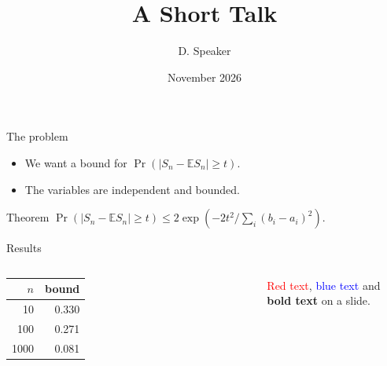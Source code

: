 \documentclass{beamer}
\title{A Short Talk}
\author{D. Speaker}
\date{November 2026}
\begin{document}
\frame{\titlepage}
\begin{frame}{The problem}
\begin{itemize}
\item We want a bound for $\Pr(|S_n - \mathbb{E} S_n| \ge t)$.
\item The variables are independent and bounded.
\end{itemize}
\begin{block}{Theorem}
$\Pr(|S_n - \mathbb{E} S_n| \ge t) \le 2\exp\left(-2t^2 / \sum_i (b_i - a_i)^2\right)$.
\end{block}
\end{frame}
\begin{frame}{Results}
\begin{columns}
\begin{tabular}{rr} $n$ & bound \\\hline 10 & 0.330 \\ 100 & 0.271 \\ 1000 & 0.081 \end{tabular}
\textcolor{red}{Red text}, \textcolor{blue}{blue text} and \textbf{bold text} on a slide.
\end{columns}
\end{frame}
\end{document}
